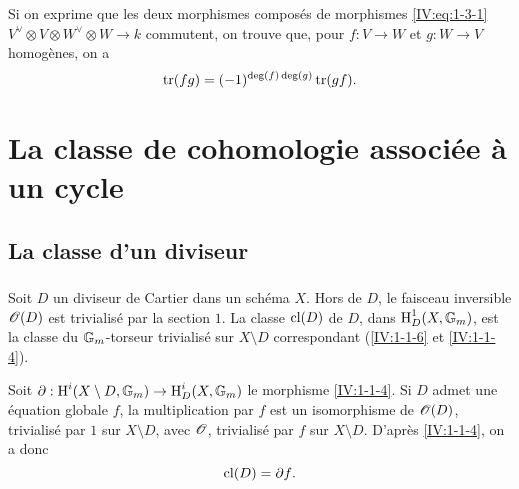 Si on exprime que les deux morphismes composés de morphismes 
\eqref{IV:eq:1-3-1} $V^\vee\otimes V\otimes W^\vee\otimes W\to k$ commutent, on 
trouve que, pour $f:V\to W$ et $g:W\to V$ homogènes, on a 
\begin{equation}\label{IV:eq:1-3-6}
  \operatorname{tr}(f g) = (-1)^{\deg(f)\deg(g)} \operatorname{tr}(g f) \text{.}
\end{equation}




















\section{La classe de cohomologie associée à un cycle}\label{IV:2}










\subsection{La classe d'un diviseur}\label{IV:2-1}





\subsubsection{}\label{IV:2-1-1}

Soit $D$ un diviseur de Cartier dans un schéma $X$. Hors de $D$, le faisceau 
inversible $\mathscr{O}(D)$ est trivialisé par la section $1$. La classe 
$\operatorname{cl}(D)$ de $D$, dans $\operatorname{H}_D^1(X,\mathbb{G}_m)$, est la classe du 
$\mathbb{G}_m$-torseur trivialisé sur $X\setminus D$ correspondant 
(\ref{IV:1-1-6} et \ref{IV:1-1-4}). 

Soit $\partial:\operatorname{H}^i(X\setminus D,\mathbb{G}_m)\to \operatorname{H}_D^i(X,\mathbb{G}_m)$ le morphisme 
\ref{IV:1-1-4}. Si $D$ admet une équation globale $f$, la multiplication par 
$f$ est un isomorphisme de $\mathscr{O}(D)$, trivialisé par $1$ sur $X\setminus D$, 
avec $\mathscr{O}$, trivialisé par $f$ sur $X\setminus D$. D'après \ref{IV:1-1-4}, 
on a donc 
\begin{equation}\label{IV:2-1-1-1}
  \operatorname{cl}(D) = \partial f \text{.}
\end{equation}

